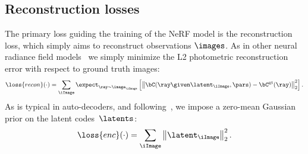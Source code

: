   \subsection{Reconstruction losses}
    \label{sec:conerf-autodecode}
    The primary loss guiding the training of the NeRF model is the
    reconstruction loss, which simply aims to reconstruct observations
    $\images$.
    As in other neural radiance field models~\cite{mildenhall2020nerf, martin2021nerf, park2020deformable, park2021hypernerf} we simply minimize the L2 photometric reconstruction error with respect to ground truth images:
    \begin{equation}
      \loss{recon}(\cdot) = \sum_\iImage \expect_{\ray \sim \image_\iImage} \left[ \left\|\bC(\ray \given \latent_\iImage, \pars)-\bC^\text{gt}(\ray) \right\|_2^2 \right]
      .
      \label{eq:conerf-recon}
    \end{equation}
    As is typical in auto-decoders, and following~\cite{park2019deepsdf}, we impose a zero-mean Gaussian prior on the latent codes~$\latents$:
    \begin{equation}
      \loss{enc}(\cdot) = \sum_\iImage \left\| \latent_\iImage \right\|^2_2
      .
      \label{eq:conerf-latent_prior}
    \end{equation}

